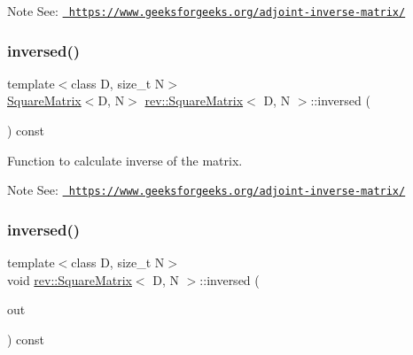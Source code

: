 \begin{DoxyNote}{Note}
See\+: \href{https://www.geeksforgeeks.org/adjoint-inverse-matrix/}{\texttt{ https\+://www.\+geeksforgeeks.\+org/adjoint-\/inverse-\/matrix/}} 
\end{DoxyNote}
\mbox{\label{classrev_1_1_square_matrix_ae92cd0e8ac462fec5cfe85a19ecf00bb}} 
\subsubsection{\texorpdfstring{inversed()}{inversed()}\hspace{0.1cm}{\footnotesize\ttfamily [1/2]}}
{\footnotesize\ttfamily template$<$class D, size\+\_\+t N$>$ \\
\mbox{\hyperlink{classrev_1_1_square_matrix}{Square\+Matrix}}$<$D, N$>$ \mbox{\hyperlink{classrev_1_1_square_matrix}{rev\+::\+Square\+Matrix}}$<$ D, N $>$\+::inversed (\begin{DoxyParamCaption}{ }\end{DoxyParamCaption}) const\hspace{0.3cm}{\ttfamily [inline]}}



Function to calculate inverse of the matrix. 

\begin{DoxyNote}{Note}
See\+: \href{https://www.geeksforgeeks.org/adjoint-inverse-matrix/}{\texttt{ https\+://www.\+geeksforgeeks.\+org/adjoint-\/inverse-\/matrix/}} 
\end{DoxyNote}
\mbox{\label{classrev_1_1_square_matrix_a6a513b349ccd3b95a8d3fc52c97825f2}} 
\subsubsection{\texorpdfstring{inversed()}{inversed()}\hspace{0.1cm}{\footnotesize\ttfamily [2/2]}}
{\footnotesize\ttfamily template$<$class D, size\+\_\+t N$>$ \\
void \mbox{\hyperlink{classrev_1_1_square_matrix}{rev\+::\+Square\+Matrix}}$<$ D, N $>$\+::inversed (\begin{DoxyParamCaption}\item[{\mbox{\hyperlink{classrev_1_1_square_matrix}{Square\+Matrix}}$<$ D, N $>$ \&}]{out }\end{DoxyParamCaption}) const\hspace{0.3cm}{\ttfamily [inline]}}



